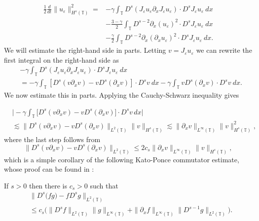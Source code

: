 \documentclass{beamer}
\newcommand{\p}{\partial}
\newcommand{\ci}{\mathbb{T}}
\newcommand{\ee}{\varepsilon}
\begin{document}
\begin{frame}
%
%
%
\begin{equation*} \begin{split}
\label{B-moli-int}
 \frac 12
\frac{d}{dt} \|u_\ee \|_{H^s(\ci)}^2
=
& -
\gamma \int_{\ci}  D^s(J_\ee u_\ee \partial_x J_\ee u_\ee) \cdot
D^s J_\ee u_\ee  \  dx
\\
&- \frac{3 -\gamma}{2} \int_{\ci} D^{s-2} \p_x (u_{\ee})^2 \cdot D^s J_\ee 
u_{\ee} \ dx
\\
& - \frac{\gamma}{2} \int_{\ci}  D^{s-2} \p_x (\p_x u_\ee)^2
\cdot D^s J_\ee u_\ee  \ dx.
\end{split}
\end{equation*}
%
%
%
We will estimate the right-hand side in parts.  
Letting $v=J_\ee u_\ee$ we can rewrite the first integral on the right-hand 
side as 
%
%
%
\begin{equation*} \begin{split}
\label{B-moli-int-v}
& -  \gamma \int_{\ci}   D^s (J_{\ee} u_{\ee} \p_x J_\ee u_\ee)
\cdot D^s
J_{\ee}u_\ee \ dx
\\
& = - \gamma \int_\ci
\left [ D^s(v\p_x v)  -  v D^s (\p_xv)
\right ] \cdot D^s v \ dx
- \gamma \int_\ci
v D^s (\p_xv) 
\cdot D^s v \ dx.
\end{split}
\end{equation*}
%
%
%
%
%
We now estimate this in parts. Applying the Cauchy-Schwarz 
inequality gives
%
%
%
\end{frame}

\begin{frame}

\begin{equation*} \label{int1-est-calc2}
\begin{split}
& \Big|
- \gamma \int_\ci
\big[ D^s(v\p_x v)  -  v D^s (\p_xv)
\big]
\cdot D^s v   \, dx
\Big|
\\
& \lesssim
\|
D^s(v\p_x v)  -  v D^s (\p_xv)
\|_{L^2(\ci)}
\|
v
\|_{H^s(\ci)}
\lesssim \| \p_x v \|_{L^\infty(\ci)} \| v \|_{H^s(\ci)}^2,
\end{split}
\end{equation*}
%
%
%
where the last step follows from 
%
%
%
\begin{equation*} \label{int1-est-calc3}
\| D^s(v\p_x v)  -  v D^s (\p_xv) \|_{L^2(\ci)}
\le
2 c_s    \| \p_x v \|_{L^\infty(\ci)} \| v \|_{H^s(\ci)},
\end{equation*}
%
%
which is a simple corollary of the following Kato-Ponce commutator 
estimate, whose proof can be found in \cite{Kato_1988_Commutator-esti}: 
%
%
\begin{lemma} \label{KP-lemma}
If  $s>0$ then there is $c_s>0$ such that 
%
%
%
\begin{equation*} \begin{split}
& \| D^{s} \big(fg) -  f D^s g\|_{L^2(\ci)}
\\
& \le
c_s \big(
\| D^{s}f \|_{L^2(\ci)}    \| g \|_{L^\infty(\ci)} 
+ \| \p_xf \|_{L^\infty(\ci)}    \| D^{s-1}g \|_{L^2(\ci)}   \big).
\end{split}
\end{equation*}
%
%
%
\end{lemma}
%
%
\end{frame}
\end{document}
